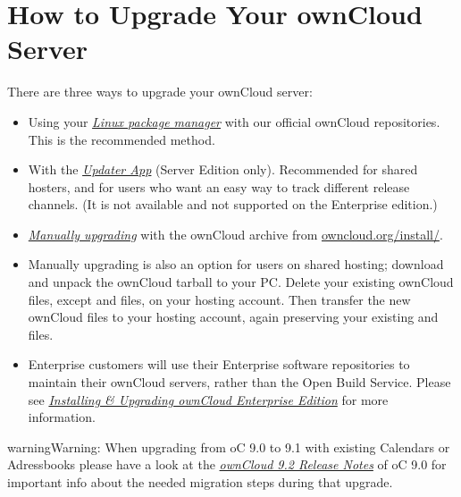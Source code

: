\documentclass[letterpaper,10pt,english]{sphinxmanual}
\begin{document}
\section{How to Upgrade Your ownCloud Server}
\label{maintenance/upgrade:how-to-upgrade-your-owncloud-server}\label{maintenance/upgrade::doc}
There are three ways to upgrade your ownCloud server:
\begin{itemize}
\item {} 
Using your {\hyperref[maintenance/package_upgrade::doc]{\emph{\emph{Linux package manager}}}} with our official
ownCloud repositories. This is the recommended method.

\item {} 
With the {\hyperref[maintenance/update::doc]{\emph{\emph{Updater App}}}} (Server Edition only). Recommended for
shared hosters, and for users who want an easy way to track different
release channels. (It is not available and not supported on the Enterprise
edition.)

\item {} 
{\hyperref[maintenance/manual_upgrade::doc]{\emph{\emph{Manually upgrading}}}} with the ownCloud  archive
from \href{https://owncloud.org/install/}{owncloud.org/install/}.

\item {} 
Manually upgrading is also an option for users on shared hosting; download
and unpack the ownCloud tarball to your PC. Delete your existing ownCloud
files, except  and  files, on your hosting account. Then
transfer the new ownCloud files to your hosting account, again
preserving your existing  and  files.

\item {} 
Enterprise customers will use their Enterprise software
repositories to maintain their ownCloud servers, rather than the Open Build
Service. Please see {\hyperref[enterprise_installation/linux_installation::doc]{\emph{\emph{Installing \& Upgrading ownCloud Enterprise Edition}}}} for
more information.

\end{itemize}

\begin{notice}{warning}{Warning:}
When upgrading from oC 9.0 to 9.1 with existing Calendars or Adressbooks
please have a look at the {\hyperref[release_notes::doc]{\emph{\emph{ownCloud 9.2 Release Notes}}}} of oC 9.0 for important info
about the needed migration steps during that upgrade.
\end{notice}
\end{document}
